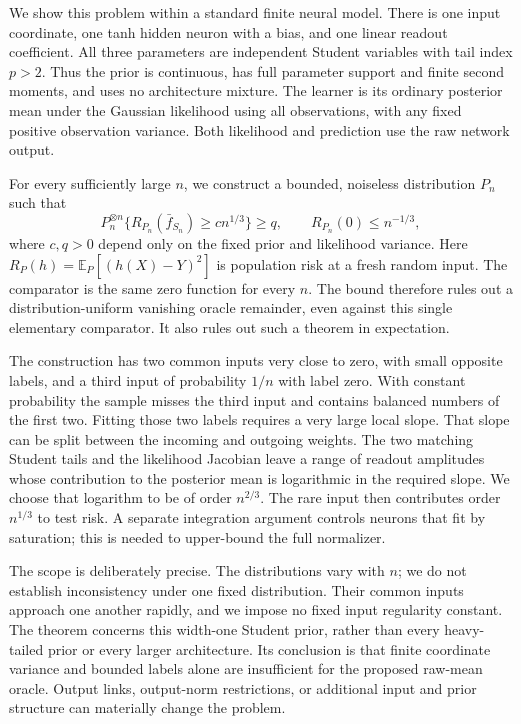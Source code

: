 \documentclass[11pt]{article}
\begin{document}
We show this problem within a standard finite neural model. There is
one input coordinate, one tanh hidden neuron with a bias, and one
linear readout coefficient. All three parameters are independent
Student variables with tail index $p>2$. Thus the prior is continuous,
has full parameter support and finite second moments, and uses no
architecture mixture. The learner is its ordinary posterior mean
under the Gaussian likelihood using all observations, with any fixed
positive observation variance. Both likelihood and prediction use
the raw network output.

For every sufficiently large $n$, we construct a bounded, noiseless
distribution $P_n$ such that
\[
 P_n^{\otimes n}\{R_{P_n}(\bar f_{S_n})\ge c n^{1/3}\}\ge q,
 \qquad R_{P_n}(0)\le n^{-1/3},
\]
where $c,q>0$ depend only on the fixed prior and likelihood variance.
Here $R_P(h)=\mathbb E_P[(h(X)-Y)^2]$ is population risk at a fresh
random input. The comparator is the same zero function for every $n$.
The bound therefore rules out a distribution-uniform vanishing
oracle remainder, even against this single elementary comparator.
It also rules out such a theorem in expectation.

The construction has two common inputs very close to zero, with
small opposite labels, and a third input of probability $1/n$ with
label zero. With constant probability the sample misses the third
input and contains balanced numbers of the first two. Fitting those
two labels requires a very large local slope. That slope can be
split between the incoming and outgoing weights. The two matching
Student tails and the likelihood Jacobian leave a range of readout
amplitudes whose contribution to the posterior mean is logarithmic
in the required slope. We choose that logarithm to be of order
$n^{2/3}$. The rare input then contributes order $n^{1/3}$ to test
risk. A separate integration argument controls neurons that fit by
saturation; this is needed to upper-bound the full normalizer.

The scope is deliberately precise. The distributions vary with $n$;
we do not establish inconsistency under one fixed distribution.
Their common inputs approach one another rapidly, and we impose no
fixed input regularity constant. The theorem concerns this
width-one Student prior, rather than every heavy-tailed prior or
every larger architecture. Its conclusion is that finite coordinate
variance and bounded labels alone are insufficient for the proposed
raw-mean oracle. Output links, output-norm restrictions, or additional
input and prior structure can materially change the problem.
\end{document}
